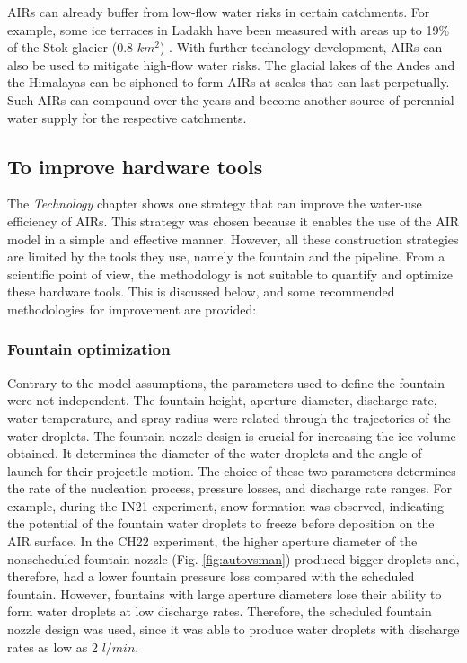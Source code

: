 \ac{AIRs} can already buffer from low-flow water risks in certain catchments. For example, some ice terraces in
Ladakh have been measured with areas up to 19\% of the Stok glacier (0.8 $km^2$)
\citet{nusserSociohydrologyArtificialGlaciers2019}. With further technology development, \ac{AIRs} can also be
used to mitigate high-flow water risks. The glacial lakes of the Andes and the Himalayas can be siphoned to form
\ac{AIRs} at scales that can last perpetually. Such \ac{AIRs} can compound over the years and become another
source of perennial water supply for the respective catchments.

\subsection{To improve hardware tools}

The \textit{Technology} chapter shows one strategy that can improve the water-use efficiency of \ac{AIRs}. This
strategy was chosen because it enables the use of the \ac{AIR} model in a simple and effective manner. However,
all these construction strategies are limited by the tools they use, namely the fountain and the pipeline. From
a scientific point of view, the methodology is not suitable to quantify and optimize these hardware tools. This
is discussed below, and some recommended methodologies for improvement are provided:

\subsubsection{Fountain optimization}

Contrary to the model assumptions, the parameters used to define the fountain were not independent. The fountain
height, aperture diameter, discharge rate, water temperature, and spray radius were related through the
trajectories of the water droplets. The fountain nozzle design is crucial for increasing the ice volume
obtained. It determines the diameter of the water droplets and the angle of launch for their projectile motion.
The choice of these two parameters determines the rate of the nucleation process, pressure losses, and discharge
rate ranges. For example, during the IN21 experiment, snow formation was observed, indicating the potential of
the fountain water droplets to freeze before deposition on the \ac{AIR} surface. In the CH22 experiment, the
higher aperture diameter of the nonscheduled fountain nozzle (Fig. \ref{fig:autovsman}) produced bigger droplets
and, therefore, had a lower fountain pressure loss compared with the scheduled fountain. However, fountains with
large aperture diameters lose their ability to form water droplets at low discharge rates. Therefore, the
scheduled fountain nozzle design was used, since it was able to produce water droplets with discharge rates as
low as 2 $l/min$.

